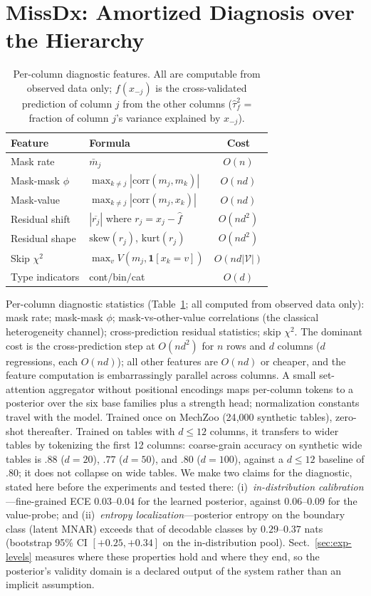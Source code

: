 \documentclass[conference]{IEEEtran}
\begin{document}
\section{MissDx: Amortized Diagnosis over the Hierarchy}\label{sec:missdx}

\begin{table}[t]
\caption{Per-column diagnostic features. All are computable from observed data only;
$f(x_{-j})$ is the cross-validated prediction of column $j$ from the other columns
($\hat\tau_f^2$ = fraction of column $j$'s variance explained by $x_{-j}$).}
\label{tab:features}
\centering\small
\begin{tabular}{llc}
\toprule
Feature & Formula & Cost \\
\midrule
Mask rate & $\bar m_j$ & $O(n)$ \\
Mask-mask $\phi$ & $\max_{k\ne j}|\mathrm{corr}(m_j,m_k)|$ & $O(nd)$ \\
Mask-value & $\max_{k\ne j}|\mathrm{corr}(m_j,x_k)|$ & $O(nd)$ \\
Residual shift & $|\overline{r_j}|$ where $r_j=x_j-\hat f$ & $O(nd^2)$ \\
Residual shape & $\mathrm{skew}(r_j)$, $\mathrm{kurt}(r_j)$ & $O(nd^2)$ \\
Skip $\chi^2$ & $\max_v V(m_j, \mathbf{1}[x_k{=}v])$ & $O(nd|\mathcal{V}|)$ \\
Type indicators & cont$/$bin$/$cat & $O(d)$ \\
\bottomrule
\end{tabular}
\end{table}

Per-column diagnostic statistics (Table~\ref{tab:features}; all computed from observed data
only): mask rate; mask-mask $\phi$; mask-vs-other-value correlations (the classical
heterogeneity channel); cross-prediction residual statistics; skip $\chi^2$. The dominant
cost is the cross-prediction step at $O(nd^2)$ for $n$ rows and $d$ columns ($d$ regressions,
each $O(nd)$); all other features are $O(nd)$ or cheaper, and the feature computation is
embarrassingly parallel across columns. A small set-attention aggregator without positional
encodings maps per-column
tokens to a posterior over the six base families plus a strength head; normalization constants
travel with the model. Trained once on MechZoo (24{,}000 synthetic tables), zero-shot thereafter. Trained on tables with $d\le12$ columns, it transfers to wider tables by tokenizing the first 12 columns: coarse-grain accuracy on synthetic wide tables is $.88$ ($d{=}20$), $.77$ ($d{=}50$), and $.80$ ($d{=}100$), against a $d{\le}12$ baseline of $.80$; it does not collapse on wide tables.
We make two claims for the diagnostic, stated here before the experiments and tested there:
(i)~\emph{in-distribution calibration}---fine-grained ECE $0.03$--$0.04$ for the learned
posterior, against $0.06$--$0.09$ for the value-probe; and
(ii)~\emph{entropy localization}---posterior entropy on the boundary class (latent MNAR)
exceeds that of decodable classes by $0.29$--$0.37$ nats (bootstrap 95\% CI $[+0.25,+0.34]$ on
the in-distribution pool). Sect.~\ref{sec:exp-levels} measures where these properties hold and
where they end, so the posterior's validity domain is a declared output of the system rather
than an implicit assumption.
\end{document}
